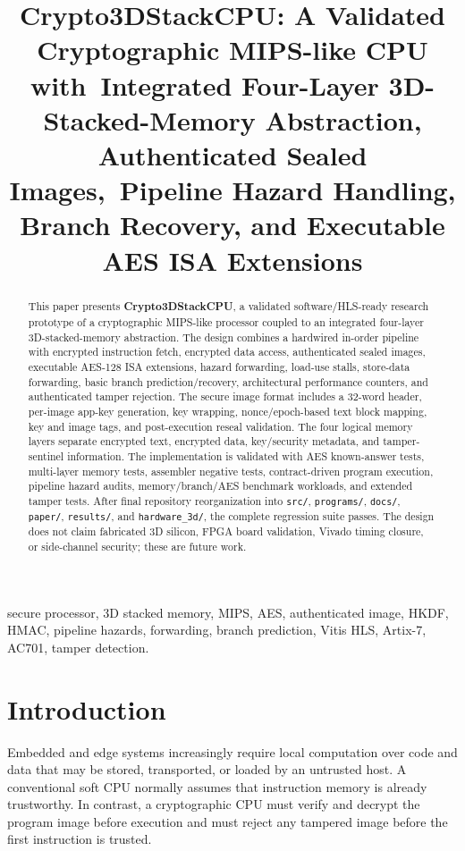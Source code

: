 \documentclass[conference]{IEEEtran}
\title{Crypto3DStackCPU: A Validated Cryptographic MIPS-like CPU with\
Integrated Four-Layer 3D-Stacked-Memory Abstraction, Authenticated Sealed Images,\
Pipeline Hazard Handling, Branch Recovery, and Executable AES ISA Extensions}
\author{\IEEEauthorblockN{George David Tsitlauri}
\IEEEauthorblockA{\textit{Department of Informatics \& Telecommunications} \\
\textit{University of Thessaly, Greece} \\
gdtsitlauri@gmail.com}}
\begin{document}
\maketitle

\begin{abstract}
This paper presents \textbf{Crypto3DStackCPU}, a validated software/HLS-ready research prototype of a cryptographic MIPS-like processor coupled to an integrated four-layer 3D-stacked-memory abstraction. The design combines a hardwired in-order pipeline with encrypted instruction fetch, encrypted data access, authenticated sealed images, executable AES-128 ISA extensions, hazard forwarding, load-use stalls, store-data forwarding, basic branch prediction/recovery, architectural performance counters, and authenticated tamper rejection. The secure image format includes a 32-word header, per-image app-key generation, key wrapping, nonce/epoch-based text block mapping, key and image tags, and post-execution reseal validation. The four logical memory layers separate encrypted text, encrypted data, key/security metadata, and tamper-sentinel information. The implementation is validated with AES known-answer tests, multi-layer memory tests, assembler negative tests, contract-driven program execution, pipeline hazard audits, memory/branch/AES benchmark workloads, and extended tamper tests. After final repository reorganization into \texttt{src/}, \texttt{programs/}, \texttt{docs/}, \texttt{paper/}, \texttt{results/}, and \texttt{hardware\_3d/}, the complete regression suite passes. The design does not claim fabricated 3D silicon, FPGA board validation, Vivado timing closure, or side-channel security; these are future work.
\end{abstract}

\begin{IEEEkeywords}
secure processor, 3D stacked memory, MIPS, AES, authenticated image, HKDF, HMAC, pipeline hazards, forwarding, branch prediction, Vitis HLS, Artix-7, AC701, tamper detection.
\end{IEEEkeywords}

\section{Introduction}

Embedded and edge systems increasingly require local computation over code and data that may be stored, transported, or loaded by an untrusted host. A conventional soft CPU normally assumes that instruction memory is already trustworthy. In contrast, a cryptographic CPU must verify and decrypt the program image before execution and must reject any tampered image before the first instruction is trusted.
\end{document}
